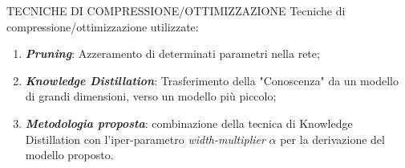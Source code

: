 \begin{frame}{TECNICHE DI COMPRESSIONE/OTTIMIZZAZIONE}
    Tecniche di compressione/ottimizzazione utilizzate:
    \begin{enumerate}
        \item {\bfseries{\emph{Pruning}}}\footnotemark[3]: Azzeramento di determinati parametri nella rete;
        \item {\bfseries{\emph{Knowledge Distillation}}}\footnotemark[4]: Trasferimento della "Conoscenza" da un modello di grandi dimensioni, verso un modello più piccolo;
        \item {\bfseries{\emph{Metodologia proposta}}}: combinazione della tecnica di Knowledge Distillation con l'iper-parametro \emph{width-multiplier} $\alpha$ per la derivazione del modello proposto.
    \end{enumerate}
\end{frame}